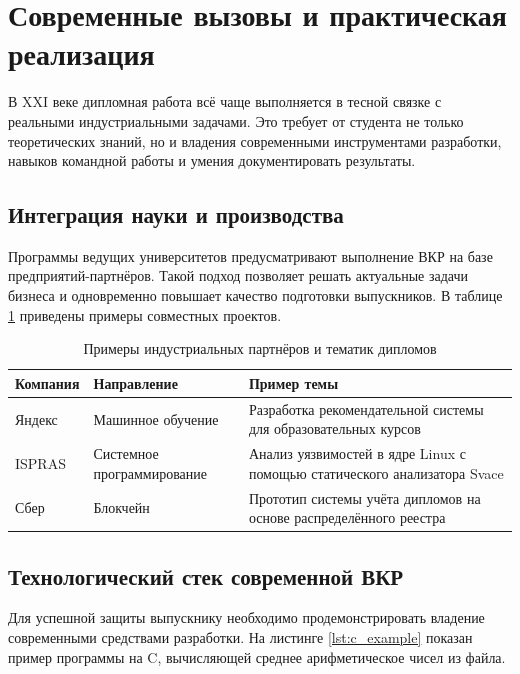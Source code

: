 \section{Современные вызовы и практическая реализация}
\label{sec:modern}

В XXI веке дипломная работа всё чаще выполняется в тесной связке с реальными индустриальными задачами. Это требует от студента не только теоретических знаний, но и владения современными инструментами разработки, навыков командной работы и умения документировать результаты.

\subsection{Интеграция науки и производства}
Программы ведущих университетов \cite{hse, mit} предусматривают выполнение ВКР на базе предприятий-партнёров. Такой подход позволяет решать актуальные задачи бизнеса и одновременно повышает качество подготовки выпускников. В таблице \ref{tab:partners} приведены примеры совместных проектов.

\begin{table}[htbp]
	\centering
	\caption{Примеры индустриальных партнёров и тематик дипломов}
	\label{tab:partners}
	\begin{tabular}{|p{3.5cm}|p{3.5cm}|p{5cm}|}
		\hline
		\textbf{Компания} & \textbf{Направление} & \textbf{Пример темы} \\
		\hline
		Яндекс & Машинное обучение & Разработка рекомендательной системы для образовательных курсов \\
		\hline
		ISPRAS & Системное программирование & Анализ уязвимостей в ядре Linux с помощью статического анализатора Svace \\
		\hline
		Сбер & Блокчейн & Прототип системы учёта дипломов на основе распределённого реестра \\
		\hline
	\end{tabular}
\end{table}

\subsection{Технологический стек современной ВКР}
Для успешной защиты выпускнику необходимо продемонстрировать владение современными средствами разработки. На листинге \ref{lst:c_example} показан пример программы на C, вычисляющей среднее арифметическое чисел из файла.

